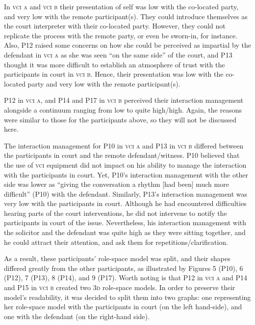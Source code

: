 \documentclass[output=paper]{langsci/langscibook}
\begin{document}
In \textsc{vci a} and \textsc{vci b} their presentation of self was low with the co-located party, and very low with the remote participant(s). They could introduce themselves as the court interpreter with their co-located party. However, they could not replicate the process with the remote party, or even be sworn-in, for instance. Also, P12 raised some concerns on how she could be perceived as impartial by the defendant in \textsc{vci a} as she was seen “on the same side” of the court, and P13 thought it was more difficult to establish an atmosphere of trust with the participants in court in \textsc{vci b}. Hence, their presentation was low with the co-located party and very low with the remote participant(s).

P12 in \textsc{vci a}, and P14 and P17 in \textsc{vci b} perceived their interaction management alongside a continuum ranging from low to quite high/high. Again, the reasons were similar to those for the participants above, so they will not be discussed here. 

The interaction management for P10 in \textsc{vci a} and P13 in \textsc{vci b} differed between the participants in court and the remote defendant/witness. P10 believed that the use of \textsc{vci} equipment did not impact on his ability to manage the interaction with the participants in court. Yet, P10’s interaction management with the other side was lower as “giving the conversation a rhythm [had been] much more difficult” (P10) with the defendant. Similarly, P13’s interaction management was very low with the participants in court. Although he had encountered difficulties hearing parts of the court interventions, he did not intervene to notify the participants in court of the issue. Nevertheless, his interaction management with the solicitor and the defendant was quite high as they were sitting together, and he could attract their attention, and ask them for repetitions/clarification.

As a result, these participants’ role-space model was split, and their shapes differed greatly from the other participants, as illustrated by Figures 5 (P10), 6 (P12), 7 (P13), 8 (P14), and 9 (P17). Worth noting is that P12 in \textsc{vci a} and P14 and P15 in \textsc{vci b} created two \textsc{3d} role-space models. In order to preserve their model’s readability, it was decided to split them into two graphs: one representing her role-space model with the participants in court (on the left hand-side), and one with the defendant (on the right-hand side).
\end{document}
